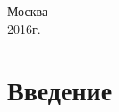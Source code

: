 \documentclass[14pt,a4paper, oneside]{extreport}
\begin{document}
\hfill{}



%
%



\vfill\vfill

\begin{center}
\normalsize Москва\\ 2016г.
\end{center}
\normalsize

\newpage

\thispagestyle{fancy}

\tableofcontents    


\chapter{Введение}
\end{document}
